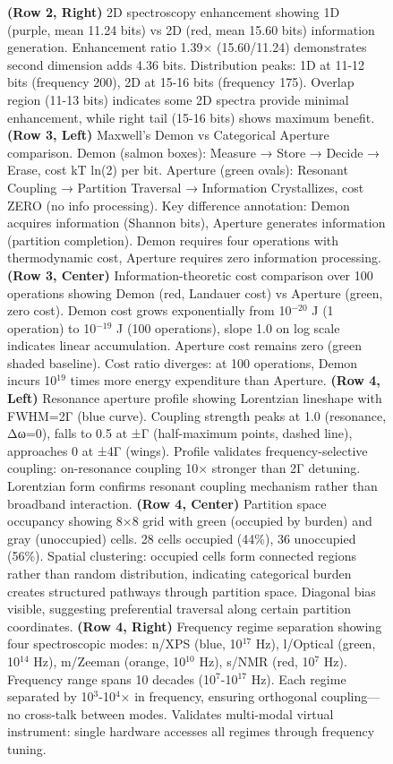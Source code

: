 \begin{figure}[htbp]
{    \textbf{(Row 2, Right)} 2D spectroscopy enhancement showing 1D (purple, mean 11.24 bits) vs 2D (red, mean 15.60 bits) information generation. Enhancement ratio 1.39× (15.60/11.24) demonstrates second dimension adds 4.36 bits. Distribution peaks: 1D at 11-12 bits (frequency 200), 2D at 15-16 bits (frequency 175). Overlap region (11-13 bits) indicates some 2D spectra provide minimal enhancement, while right tail (15-16 bits) shows maximum benefit. 
    \textbf{(Row 3, Left)} Maxwell's Demon vs Categorical Aperture comparison. Demon (salmon boxes): Measure → Store → Decide → Erase, cost kT ln(2) per bit. Aperture (green ovals): Resonant Coupling → Partition Traversal → Information Crystallizes, cost ZERO (no info processing). Key difference annotation: Demon acquires information (Shannon bits), Aperture generates information (partition completion). Demon requires four operations with thermodynamic cost, Aperture requires zero information processing. 
    \textbf{(Row 3, Center)} Information-theoretic cost comparison over 100 operations showing Demon (red, Landauer cost) vs Aperture (green, zero cost). Demon cost grows exponentially from 10$^{-20}$ J (1 operation) to 10$^{-19}$ J (100 operations), slope 1.0 on log scale indicates linear accumulation. Aperture cost remains zero (green shaded baseline). Cost ratio diverges: at 100 operations, Demon incurs 10$^{19}$ times more energy expenditure than Aperture. 
    \textbf{(Row 4, Left)} Resonance aperture profile showing Lorentzian lineshape with FWHM=2Γ (blue curve). Coupling strength peaks at 1.0 (resonance, Δω=0), falls to 0.5 at ±Γ (half-maximum points, dashed line), approaches 0 at ±4Γ (wings). Profile validates frequency-selective coupling: on-resonance coupling 10× stronger than 2Γ detuning. Lorentzian form confirms resonant coupling mechanism rather than broadband interaction. 
    \textbf{(Row 4, Center)} Partition space occupancy showing 8×8 grid with green (occupied by burden) and gray (unoccupied) cells. 28 cells occupied (44\%), 36 unoccupied (56\%). Spatial clustering: occupied cells form connected regions rather than random distribution, indicating categorical burden creates structured pathways through partition space. Diagonal bias visible, suggesting preferential traversal along certain partition coordinates. 
    \textbf{(Row 4, Right)} Frequency regime separation showing four spectroscopic modes: n/XPS (blue, 10$^{17}$ Hz), l/Optical (green, 10$^{14}$ Hz), m/Zeeman (orange, 10$^{10}$ Hz), s/NMR (red, 10$^{7}$ Hz). Frequency range spans 10 decades (10$^{7}$-10$^{17}$ Hz). Each regime separated by 10$^{3}$-10$^{4}$× in frequency, ensuring orthogonal coupling—no cross-talk between modes. Validates multi-modal virtual instrument: single hardware accesses all regimes through frequency tuning. 
}
\end{figure}
